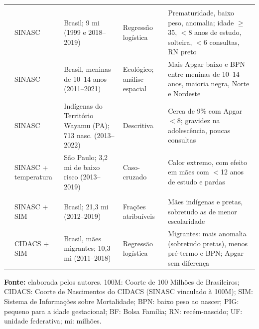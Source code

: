 \begin{table}[H]
\begin{tabularx}{\textwidth}{@{}p{2.3cm} p{1.85cm} p{2.55cm} p{2.35cm} Y@{}}
\addlinespace[3.5pt]
 \\
\cite{magalhaes2023} & SINASC & Brasil; 9 mi (1999 e 2018--2019) & Regressão logística & Prematuridade, baixo peso, anomalia; idade $\geq$35, $<$8 anos de estudo, solteira, $<$6 consultas, RN preto \\
\cite{pinto2024} & SINASC & Brasil, meninas de 10--14 anos (2011--2021) & Ecológico; análise espacial & Mais Apgar baixo e BPN entre meninas de 10--14 anos, maioria negra, Norte e Nordeste \\
\cite{lima2025} & SINASC & Indígenas do Território Wayamu (PA); 713 nasc. (2013--2022) & Descritiva & Cerca de 9\% com Apgar $<$8; gravidez na adolescência, poucas consultas \\
\cite{delcarretto2025} & SINASC + temperatura & São Paulo; 3,2 mi de baixo risco (2013--2019) & Caso-cruzado & Calor extremo, com efeito em mães com $<$12 anos de estudo e pardas \\

\addlinespace[3.5pt]
 \\
\cite{reboucas2024} & SINASC + SIM & Brasil; 21,3 mi (2012--2019) & Frações atribuíveis & Mães indígenas e pretas, sobretudo as de menor escolaridade \\
\cite{pescarini2024} & CIDACS + SIM & Brasil, mães migrantes; 10,3 mi (2011--2018) & Regressão logística & Migrantes: mais anomalia (sobretudo pretas), menos pré-termo e BPN; Apgar sem diferença \\
\bottomrule
\end{tabularx}

\vspace{3pt}
\parbox{\textwidth}{\raggedright\fontsize{6.5}{7.5}\selectfont
\textbf{Fonte:} elaborada pelos autores. 100M: Coorte de 100 Milhões de Brasileiros; CIDACS: Coorte de Nascimentos do CIDACS (SINASC vinculado à 100M); SIM: Sistema de Informações sobre Mortalidade; BPN: baixo peso ao nascer; PIG: pequeno para a idade gestacional; BF: Bolsa Família; RN: recém-nascido; UF: unidade federativa; mi: milhões.}
\end{table}